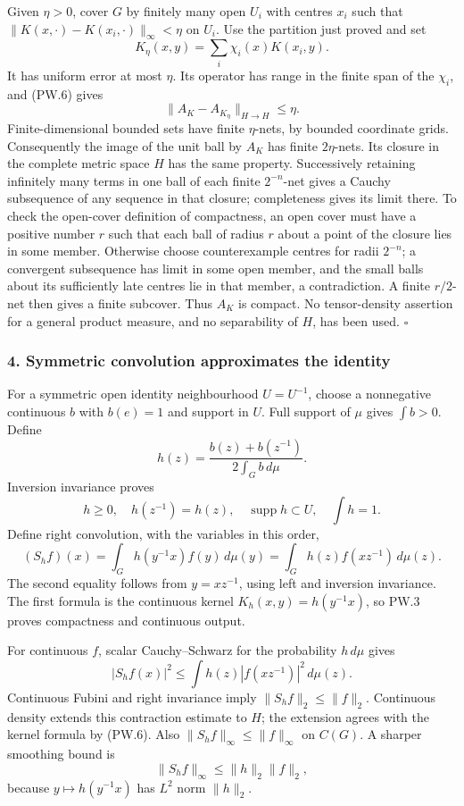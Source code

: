 \documentclass[
  11pt,
]{article}
\begin{document}
Given \(\eta>0\), cover \(G\) by finitely many open \(U_i\) with centres
\(x_i\) such that \(\|K(x,\cdot)-K(x_i,\cdot)\|_\infty<\eta\) on
\(U_i\). Use the partition just proved and set \[
K_\eta(x,y)=\sum_i\chi_i(x)K(x_i,y).
\] It has uniform error at most \(\eta\). Its operator has range in the
finite span of the \(\chi_i\), and (PW.6) gives \[
\|A_K-A_{K_\eta}\|_{H\to H}\leq\eta.
\tag{PW.7}
\] Finite-dimensional bounded sets have finite \(\eta\)-nets, by bounded
coordinate grids. Consequently the image of the unit ball by \(A_K\) has
finite \(2\eta\)-nets. Its closure in the complete metric space \(H\)
has the same property. Successively retaining infinitely many terms in
one ball of each finite \(2^{-n}\)-net gives a Cauchy subsequence of any
sequence in that closure; completeness gives its limit there. To check
the open-cover definition of compactness, an open cover must have a
positive number \(r\) such that each ball of radius \(r\) about a point
of the closure lies in some member. Otherwise choose counterexample
centres for radii \(2^{-n}\); a convergent subsequence has limit in some
open member, and the small balls about its sufficiently late centres lie
in that member, a contradiction. A finite \(r/2\)-net then gives a
finite subcover. Thus \(A_K\) is compact. No tensor-density assertion
for a general product measure, and no separability of \(H\), has been
used. \(\square\)

\subsubsection{4. Symmetric convolution approximates the
identity}\label{symmetric-convolution-approximates-the-identity}

For a symmetric open identity neighbourhood \(U=U^{-1}\), choose a
nonnegative continuous \(b\) with \(b(e)=1\) and support in \(U\). Full
support of \(\mu\) gives \(\int b>0\). Define \[
h(z)=\frac{b(z)+b(z^{-1})}{2\int_G b\,d\mu}.
\tag{PW.8}
\] Inversion invariance proves \[
h\geq0,\quad h(z^{-1})=h(z),\quad
\operatorname{supp}h\subset U,\quad \int h=1.
\] Define right convolution, with the variables in this order, \[
(S_hf)(x)=\int_G h(y^{-1}x)f(y)\,d\mu(y)
=\int_G h(z)f(xz^{-1})\,d\mu(z).
\tag{PW.9}
\] The second equality follows from \(y=xz^{-1}\), using left and
inversion invariance. The first formula is the continuous kernel
\(K_h(x,y)=h(y^{-1}x)\), so PW.3 proves compactness and continuous
output.

For continuous \(f\), scalar Cauchy--Schwarz for the probability
\(h\,d\mu\) gives \[
|S_hf(x)|^2\leq\int h(z)|f(xz^{-1})|^2\,d\mu(z).
\] Continuous Fubini and right invariance imply
\(\|S_hf\|_2\leq\|f\|_2\). Continuous density extends this contraction
estimate to \(H\); the extension agrees with the kernel formula by
(PW.6). Also \(\|S_hf\|_\infty\leq\|f\|_\infty\) on \(C(G)\). A sharper
smoothing bound is \[
\|S_hf\|_\infty\leq\|h\|_2\|f\|_2,
\tag{PW.10}
\] because \(y\mapsto h(y^{-1}x)\) has \(L^2\) norm \(\|h\|_2\).
\end{document}
